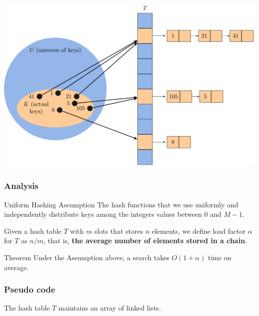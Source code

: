 \documentclass[aspectratio=169, 14pt]{beamer}
\begin{document}
\begin{frame}    
\includegraphics[width=.85\textwidth]{week11/chain}
\end{frame}

\begin{frame}
    \frametitle{Analysis}

\begin{exampleblock}{Uniform Hashing Assumption}
The hash functions that we use uniformly and independently distribute keys among the integers values between $0$ and $M - 1$.    
\end{exampleblock}

    Given a hash table $T$ with $m$ slots that stores $n$ elements, we define \alert{load factor} $\alpha$ for $T$ as $n/m$, that is, \textbf{the average number of elements stored in a chain}.

    \begin{exampleblock}{Theorem}
Under the Assumption above, a search takes $O(1+\alpha)$ time on average.        
    \end{exampleblock}
\end{frame}

\begin{frame}[fragile]
    \frametitle{Pseudo code}
The hash table $T$ maintains an array of linked lists.



\end{frame}
\end{document}
